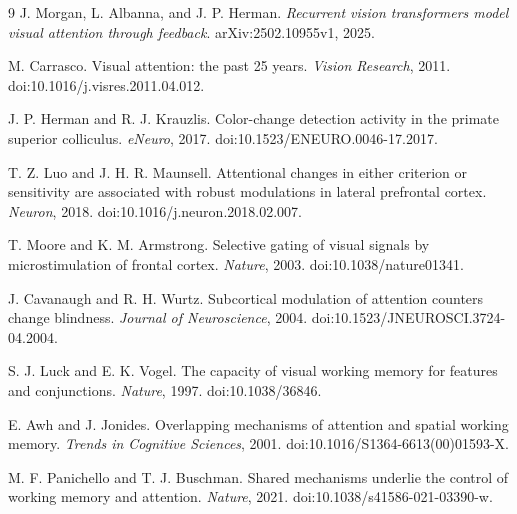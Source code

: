\documentclass[11pt,a4paper]{article}
\begin{document}
\clearpage
\begin{thebibliography}{9}
 J. Morgan, L. Albanna, and J. P. Herman. \emph{Recurrent vision transformers model visual attention through feedback}. arXiv:2502.10955v1, 2025.

 M. Carrasco. Visual attention: the past 25 years. \emph{Vision Research}, 2011. doi:10.1016/j.visres.2011.04.012.

 J. P. Herman and R. J. Krauzlis. Color-change detection activity in the primate superior colliculus. \emph{eNeuro}, 2017. doi:10.1523/ENEURO.0046-17.2017.

 T. Z. Luo and J. H. R. Maunsell. Attentional changes in either criterion or sensitivity are associated with robust modulations in lateral prefrontal cortex. \emph{Neuron}, 2018. doi:10.1016/j.neuron.2018.02.007.

 T. Moore and K. M. Armstrong. Selective gating of visual signals by microstimulation of frontal cortex. \emph{Nature}, 2003. doi:10.1038/nature01341.

 J. Cavanaugh and R. H. Wurtz. Subcortical modulation of attention counters change blindness. \emph{Journal of Neuroscience}, 2004. doi:10.1523/JNEUROSCI.3724-04.2004.

 S. J. Luck and E. K. Vogel. The capacity of visual working memory for features and conjunctions. \emph{Nature}, 1997. doi:10.1038/36846.

 E. Awh and J. Jonides. Overlapping mechanisms of attention and spatial working memory. \emph{Trends in Cognitive Sciences}, 2001. doi:10.1016/S1364-6613(00)01593-X.

 M. F. Panichello and T. J. Buschman. Shared mechanisms underlie the control of working memory and attention. \emph{Nature}, 2021. doi:10.1038/s41586-021-03390-w.
\end{thebibliography}
\end{document}
